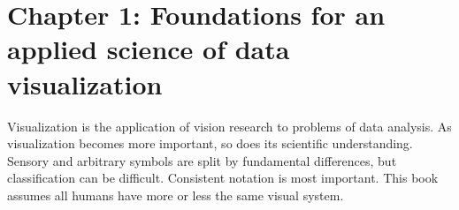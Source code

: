 \section{Chapter 1: Foundations for an applied science of data visualization}

\graphicspath{ {pngs/ch1/} }


\secttoc


Visualization is the application of vision research to problems of data
analysis. As visualization becomes more important, so does its scientific
understanding. Sensory and arbitrary symbols are split by fundamental
differences, but classification can be difficult. Consistent notation is most
important. This book assumes all humans have more or less the same visual
system.

